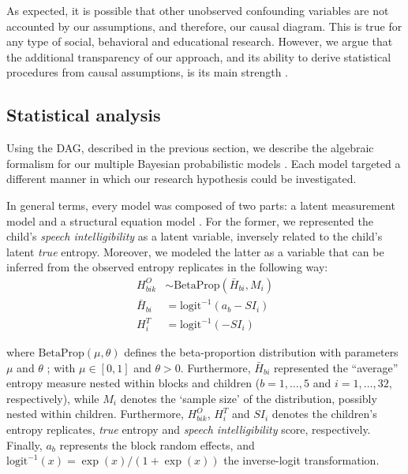 As expected, it is possible that other unobserved confounding variables are not accounted by our assumptions, and therefore, our causal diagram. This is true for any type of social, behavioral and educational research. However, we argue that the additional transparency of our approach, and its ability to derive statistical procedures from causal assumptions, is its main strength \cite{McElreath_2020, Yarkoni_2020, Rohrer_et_al_2021}.
%
%
\subsection{Statistical analysis} \label{sS:stat_analysis}
%
Using the DAG, described in the previous section, we describe the algebraic formalism for our multiple Bayesian probabilistic models \cite{Jaynes_2003}. Each model targeted a different manner in which our research hypothesis could be investigated.

In general terms, every model was composed of two parts: a latent measurement model \cite{Everitt_1984} and a structural equation model \cite{Hoyle_et_al_2014}. For the former, we represented the child's \textit{speech intelligibility} as a latent variable, inversely related to the child's latent \textit{true} entropy. Moreover, we modeled the latter as a variable that can be inferred from the observed entropy replicates in the following way:
%
\begin{align}
	H^{O}_{bik} & \sim \text{BetaProp} \left( \bar{H}_{bi}, M_{i} \right) \\ 
	\bar{H}_{bi} &= \text{logit}^{-1}( a_{b} -SI_{i} ) \\
	H^{T}_{i} &= \text{logit}^{-1}( -SI_{i} )
\end{align} 

\noindent where $\text{BetaProp}(\mu, \theta)$ defines the beta-proportion distribution with parameters $\mu$ and $\theta$ \cite{Figueroa-Zuniga_et_al_2013, Kruschke_2015}; with $\mu \in [0,1]$ and $\theta>0$. Furthermore, $\bar{H}_{bi}$ represented the ``average'' entropy measure nested within blocks and children ($b=1,\dots,5$ and $i=1,\dots,32$, respectively), while $M_{i}$ denotes the `sample size' of the distribution, possibly nested within children. Furthermore, $H^{O}_{bik}$, $H^{T}_{i}$ and $SI_{i}$ denotes the children's entropy replicates, \textit{true} entropy and \textit{speech intelligibility} score, respectively. Finally, $a_{b}$ represents the block random effects, and $\text{logit}^{-1}(x) = \exp(x) / ( 1 + \exp(x) )$ the inverse-logit transformation. 

